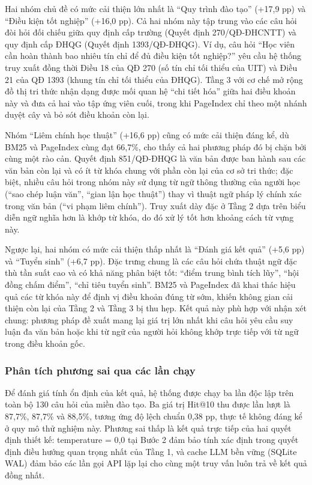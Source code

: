 Hai nhóm chủ đề có mức cải thiện lớn nhất là ``Quy trình đào tạo'' (+17,9 pp) và ``Điều
kiện tốt nghiệp'' (+16,0 pp). Cả hai nhóm này tập trung vào các câu hỏi đòi hỏi đối chiếu
giữa quy định cấp trường (Quyết định 270/QĐ-ĐHCNTT) và quy định cấp ĐHQG (Quyết
định 1393/QĐ-ĐHQG). Ví dụ, câu hỏi ``Học viên cần hoàn thành bao nhiêu tín chỉ để đủ
điều kiện tốt nghiệp?'' yêu cầu hệ thống truy xuất đồng thời Điều 18 của QĐ 270 (số tín
chỉ tối thiểu của UIT) và Điều 21 của QĐ 1393 (khung tín chỉ tối thiểu của ĐHQG). Tầng
3 với cơ chế mở rộng đồ thị tri thức nhận dạng được mối quan hệ ``chi tiết hóa'' giữa hai
điều khoản này và đưa cả hai vào tập ứng viên cuối, trong khi PageIndex chỉ theo một
nhánh duyệt cây và bỏ sót điều khoản còn lại.

Nhóm ``Liêm chính học thuật'' (+16,6 pp) cũng có mức cải thiện đáng kể, dù BM25 và
PageIndex cùng đạt 66,7\%, cho thấy cả hai phương pháp đó bị chặn bởi cùng một rào
cản. Quyết định 851/QĐ-ĐHQG là văn bản được ban hành sau các văn bản còn lại và có ít
từ khóa chung với phần còn lại của cơ sở tri thức; đặc biệt, nhiều câu hỏi trong nhóm này
sử dụng từ ngữ thông thường của người học (``sao chép luận văn'', ``gian lận học thuật'')
thay vì thuật ngữ pháp lý chính xác trong văn bản (``vi phạm liêm chính''). Truy xuất dày
đặc ở Tầng 2 dựa trên biểu diễn ngữ nghĩa hơn là khớp từ khóa, do đó xử lý tốt hơn
khoảng cách từ vựng này.

Ngược lại, hai nhóm có mức cải thiện thấp nhất là ``Đánh giá kết quả'' (+5,6 pp) và
``Tuyển sinh'' (+6,7 pp). Đặc trưng chung là các câu hỏi chứa thuật ngữ đặc thù tần suất
cao và có khả năng phân biệt tốt: ``điểm trung bình tích lũy'', ``hội đồng chấm điểm'',
``chỉ tiêu tuyển sinh''. BM25 và PageIndex đã khai thác hiệu quả các từ khóa này để định
vị điều khoản đúng từ sớm, khiến không gian cải thiện còn lại của Tầng 2 và Tầng 3 bị
thu hẹp. Kết quả này phù hợp với nhận xét chung: phương pháp đề xuất mang lại giá trị
lớn nhất khi câu hỏi yêu cầu suy luận đa văn bản hoặc khi từ ngữ của người hỏi không
khớp trực tiếp với từ ngữ trong điều khoản gốc.

\subsubsection*{Phân tích phương sai qua các lần chạy}

Để đánh giá tính ổn định của kết quả, hệ thống được chạy ba lần độc lập trên toàn bộ
130 câu hỏi của miền đào tạo. Ba giá trị Hit@10 thu được lần lượt là 87,7\%, 87,7\% và
88,5\%, tương ứng độ lệch chuẩn 0,38 pp, thực tế không đáng kể ở quy mô thử nghiệm
này. Phương sai thấp là kết quả trực tiếp của hai quyết định thiết kế: temperature = 0,0
tại Bước 2 đảm bảo tính xác định trong quyết định điều hướng quan trọng nhất của Tầng
1, và cache LLM bền vững (SQLite WAL) đảm bảo các lần gọi API lặp lại cho cùng một
truy vấn luôn trả về kết quả đồng nhất.

